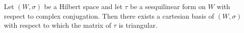 Let $(W, \sigma)$ be a Hilbert space and let $\tau$ be a sesquilinear form on $W$ with respect to complex conjugation. Then there exists a cartesian basis of $(W, \sigma)$ with respect to which the matrix of $\tau$ is triangular.
